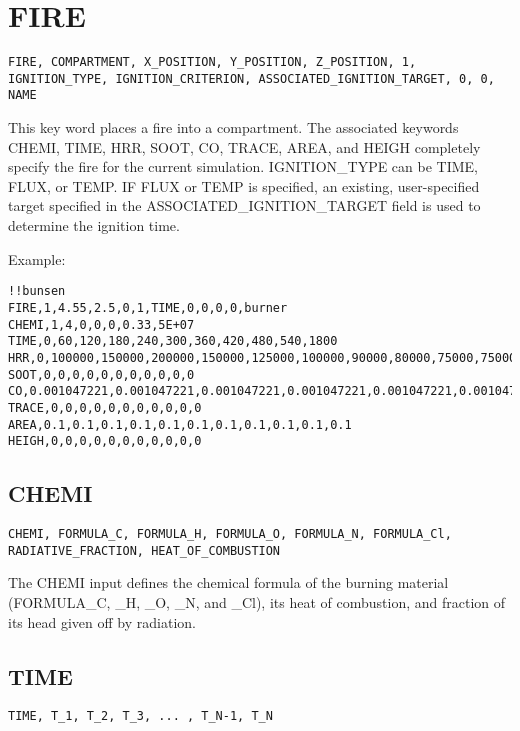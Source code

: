 \section{FIRE}

\begin{lstlisting}
FIRE, COMPARTMENT, X_POSITION, Y_POSITION, Z_POSITION, 1, IGNITION_TYPE, IGNITION_CRITERION, ASSOCIATED_IGNITION_TARGET, 0, 0, NAME
\end{lstlisting}

This key word places a fire into a compartment. The associated keywords CHEMI, TIME, HRR, SOOT, CO, TRACE, AREA, and HEIGH completely specify the fire for the current simulation. IGNITION\_TYPE can be TIME, FLUX, or TEMP.  IF FLUX or TEMP is specified, an existing, user-specified target specified in the ASSOCIATED\_IGNITION\_TARGET field is used to determine the ignition time.

Example:

\begin{lstlisting}
!!bunsen
FIRE,1,4.55,2.5,0,1,TIME,0,0,0,0,burner
CHEMI,1,4,0,0,0,0.33,5E+07
TIME,0,60,120,180,240,300,360,420,480,540,1800
HRR,0,100000,150000,200000,150000,125000,100000,90000,80000,75000,75000
SOOT,0,0,0,0,0,0,0,0,0,0,0
CO,0.001047221,0.001047221,0.001047221,0.001047221,0.001047221,0.001047221,0.001047221,0.001047221,0.001047221,0.001047221,0.001047221
TRACE,0,0,0,0,0,0,0,0,0,0,0
AREA,0.1,0.1,0.1,0.1,0.1,0.1,0.1,0.1,0.1,0.1,0.1
HEIGH,0,0,0,0,0,0,0,0,0,0,0
\end{lstlisting}

\subsection{CHEMI}

\begin{lstlisting}
CHEMI, FORMULA_C, FORMULA_H, FORMULA_O, FORMULA_N, FORMULA_Cl,  RADIATIVE_FRACTION, HEAT_OF_COMBUSTION
\end{lstlisting}

The CHEMI input defines the chemical formula of the burning material (FORMULA\_C, \_H, \_O, \_N, and \_Cl), its heat of combustion, and fraction of its head given off by radiation.

\subsection{TIME}

\begin{lstlisting}
TIME, T_1, T_2, T_3, ... , T_N-1, T_N
\end{lstlisting}

